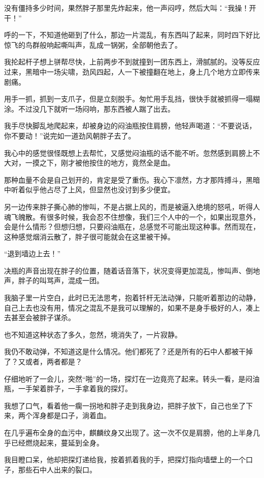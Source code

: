 没有僵持多少时间，果然胖子那里先炸起来，他一声闷哼，然后大叫：“我操！开干！”

呼的一下，不知道他砸到了什么，那边一片混乱，有东西叫了起来，同时四下好比惊飞的鸟群般响起嘶叫声，乱成一锅粥，全部朝他去了。

我抡起杆子想上骈帮尽快，上前两步不到就撞到一团东西上，滑腻腻的。没等反应过来，黑暗中一场尖啸，劲风四起，人一下被撞翻在地上，身上几个地方立即传来剧痛。

用手一抓，抓到一支爪子，但是立刻脱手。匆忙用手乱挡，很快手就被抓得一塌糊涂。不过没几下就听一场闷响，那东西被人踹了出去。

我手尽快脚乱地爬起来，却被身边的闷油瓶按住肩膀，他轻声喝道：“不要说话，你不要动！”说完如一道劲风朝胖子去了。

我心中的感觉很怪既想上去帮忙，又感觉闷油瓶的话不能不听。忽然感到肩膀上不大对，一摸之下，刚才被他按住的地方，竟然全是血。

那种血量不会是自己划开的，肯定是受了重伤。我心下凛然，方才那阵搏斗，黑暗中听着似乎他占尽了上风，但显然也没讨到多少便宜。

另一边传来胖子撕心肺的惨叫，不是占据上风的，而是被逼入绝境的怒吼，听得人魂飞魄散。有很多时候，我会忍不住想像，我们三个人中的一个，如果出现意外，会是什么情形？但想归想，只要闷油瓶在，总感觉不可能出现这种事。然而现在，这种感觉烟消云散了，胖子很可能就会在这里被干掉。

“退到墙边上去！”

决瓶的声音出现在胖子的位置，随着话音落下，状况变得更加混乱，惨叫声、倒地声，胖子的叫骂声，混成一团。

我脑子里一片空白，此时已无法思考，抱着钎杆无法动弹，只能听着那边的动静，自己上去也没有用，情况之混乱不是我可以理解的，如果不是身手极好的人，凑上去甚至会被胖子谋杀。

也不知道这种状态了多久，忽然，境消失了，一片寂静。

我仍不敢动弹，不知道这是什么情况。他们都死了？还是所有的石中人都被干掉了？又或者，两者都是？

仔细地听了一会儿，突然“啪”的一场，探灯在一边竟亮了起来。转头一看，是闷油瓶，一手架着胖子，一手拿着我的探灯。

我想了口气，看着他一瘸一拐地和胖子走到我身边，把胖子放下，自己也坐了下来，两个浑身都是口子，淌着血。

在几乎遍布全身的血污中，麒麟纹身又出现了。这一次不仅是肩膀，他的上半身几乎已经燃烧起来，蔓延到全身。

我目瞪口呆，他却把探灯递给我，按着抓着我的手，把探灯指向墙壁上的一个口子，那些石中人出来的裂口。

